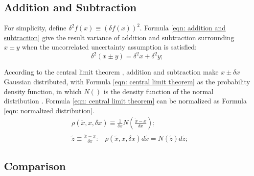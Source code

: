 \documentclass[twoside]{article}
\numberwithin{equation}{section}
\newcommand{\eqspace}{\;\;\;}
\begin{document}
\subsection{Addition and Subtraction}


For simplicity, define $\delta^2 f(x) \equiv (\delta f(x))^2$. 
Formula \eqref{eqn: addition and subtraction} give the result variance of addition and subtraction surrounding $x \pm y$ when the uncorrelated uncertainty assumption is satisfied:
\begin{equation}
\label{eqn: addition and subtraction}
\delta^2 (x \pm y) = \delta^2 x + \delta^2 y;
\end{equation}

According to the central limit theorem \cite{Probability_Statistics}, addition and subtraction make $x \pm \delta x$ Gaussian distributed, with Formula \eqref{eqn: central limit theorem} as the probability density function, in which $N()$ is the density function of the  normal distribution \cite{Probability_Statistics}.
Formula \eqref{eqn: central limit theorem} can be normalized as Formula \eqref{eqn: normalized distribution}.
\begin{align}
\label{eqn: central limit theorem}
& \rho(\tilde{x}, x, \delta x) \equiv \frac{1}{\delta x} N(\frac{\tilde{x} - x}{\delta x}); \\
\label{eqn: normalized distribution}
& \tilde{z} \equiv \frac{\tilde{x} - x}{\delta x}:\eqspace \rho(\tilde{x}, x, \delta x) d \tilde{x} = N(\tilde{z}) d \tilde{z};
\end{align}



\subsection{Comparison}

\iffalse
\end{document}
